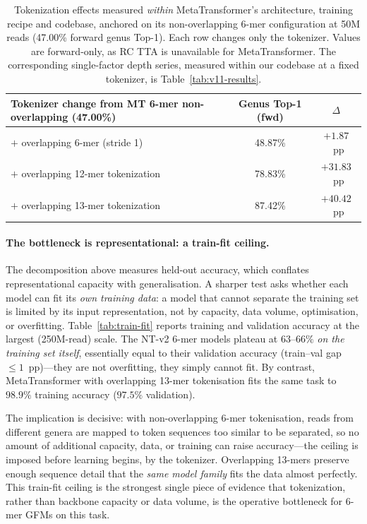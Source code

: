\begin{table}[htbp]
    \centering
    \caption{Tokenization effects measured \emph{within} MetaTransformer's architecture, training recipe and codebase, anchored on its non-overlapping 6-mer configuration at 50M reads (47.00\% forward genus Top-1). Each row changes only the tokenizer. Values are forward-only, as RC TTA is unavailable for MetaTransformer. The corresponding single-factor depth series, measured within our codebase at a fixed tokenizer, is Table~\ref{tab:v11-results}.}
    \label{tab:pretraining-tokenization-decomp}
    \small
    \begin{tabular}{lcc}
        \toprule
        \textbf{Tokenizer change from MT 6-mer non-overlapping (47.00\%)} & \textbf{Genus Top-1 (fwd)} & \textbf{$\Delta$} \\
        \midrule
        $+$ overlapping 6-mer (stride 1)               & 48.87\% & $+1.87$~pp \\
        $+$ overlapping 12-mer tokenization            & 78.83\% & $+31.83$~pp \\
        $+$ overlapping 13-mer tokenization            & 87.42\% & $+40.42$~pp \\
        \bottomrule
    \end{tabular}
\end{table}

\paragraph{The bottleneck is representational: a train-fit ceiling.}
The decomposition above measures held-out accuracy, which conflates representational capacity with generalisation. A sharper test asks whether each model can fit its \emph{own training data}: a model that cannot separate the training set is limited by its input representation, not by capacity, data volume, optimisation, or overfitting. Table~\ref{tab:train-fit} reports training and validation accuracy at the largest (250M-read) scale. The NT-v2 6-mer models plateau at $63$--$66\%$ \emph{on the training set itself}, essentially equal to their validation accuracy (train--val gap ${\le}1$~pp)---they are not overfitting, they simply cannot fit. By contrast, MetaTransformer with overlapping 13-mer tokenisation fits the same task to $98.9\%$ training accuracy ($97.5\%$ validation).

The implication is decisive: with non-overlapping 6-mer tokenisation, reads from different genera are mapped to token sequences too similar to be separated, so no amount of additional capacity, data, or training can raise accuracy---the ceiling is imposed before learning begins, by the tokenizer. Overlapping 13-mers preserve enough sequence detail that the \emph{same model family} fits the data almost perfectly. This train-fit ceiling is the strongest single piece of evidence that tokenization, rather than backbone capacity or data volume, is the operative bottleneck for 6-mer GFMs on this task.

